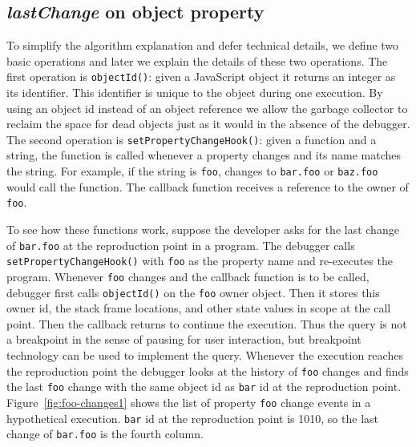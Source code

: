 \documentclass{sig-alternate}
\begin{document}
\subsection{{\large\bf\textit{lastChange}} on object property}
To simplify the algorithm explanation and defer technical details, we
define two basic operations and later we explain the details of these
two operations. The first operation is \texttt{objectId()}: given a
JavaScript object it returns an integer as its identifier. This
identifier is unique to the object during one execution.  By using an
object id instead of an object reference we allow the garbage
collector to reclaim the space for dead objects just as it would in the
absence of the debugger. The second
operation is \texttt{setPropertyChangeHook()}: given a function and a
string, the function is called whenever a property changes and its
name matches the string. For example, if the string is 
\texttt{foo}, changes to \texttt{bar.foo} or \texttt{baz.foo} would
call the function.  The callback function receives a reference to the
owner of \texttt{foo}. 

To see how these functions work, suppose the developer asks for the
last change of \texttt{bar.foo} at the reproduction point in a
program. The debugger calls \texttt{setPropertyChangeHook()} with
\texttt{foo} as the property name and re-executes the
program. Whenever \texttt{foo} changes and the callback function is to
be called, debugger first calls \texttt{objectId()} on the
\texttt{foo} owner object. Then it stores this owner id, the stack
frame locations, and other state values in scope at the call point. 
Then the callback returns to continue the execution. Thus the query is not 
a breakpoint in the sense of pausing for user interaction, but breakpoint 
technology can be used to implement the query.
Whenever the execution reaches the reproduction point the debugger
looks at the history of \texttt{foo} changes and finds the last
\texttt{foo} change with the same object id as \texttt{bar} id at the
reproduction point. Figure~\ref{fig:foo-changes1} shows the list of
property \texttt{foo} change events in a hypothetical
execution. \texttt{bar} id at the reproduction point is 1010, so the
last change of \texttt{bar.foo} is the fourth column. 
\end{document}
